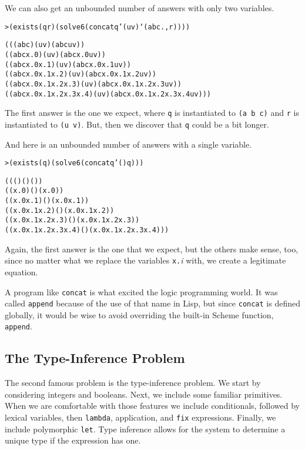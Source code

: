 We can also get an unbounded number of answers with only two variables.

\begin{alltt}
> (exists (q r) (solve 6 (concat q '(u v) `(a b c . ,r))))

(((a b c) (u v) (a b c u v))
((a b c x.0) (u v) (a b c x.0 u v))
((a b c x.0 x.1) (u v) (a b c x.0 x.1 u v))
((a b c x.0 x.1 x.2) (u v) (a b c x.0 x.1 x.2 u v))
((a b c x.0 x.1 x.2 x.3) (u v) (a b c x.0 x.1 x.2 x.3 u v))
((a b c x.0 x.1 x.2 x.3 x.4) (u v) (a b c x.0 x.1 x.2 x.3 x.4 u v)))
\end{alltt}

\noindent
The first answer is the one we expect, where \texttt{q} is
instantiated to \texttt{(a b c)} and \texttt{r} is instantiated to
\texttt{(u v)}.  But, then we discover that \texttt{q} could be a bit
longer.  

And here is an unbounded number of answers with a single variable.

\begin{alltt}
> (exists (q) (solve 6 (concat q '() q)))

((() () ())
((x.0) () (x.0))
((x.0 x.1) () (x.0 x.1))
((x.0 x.1 x.2) () (x.0 x.1 x.2))
((x.0 x.1 x.2 x.3) () (x.0 x.1 x.2 x.3))
((x.0 x.1 x.2 x.3 x.4) () (x.0 x.1 x.2 x.3 x.4)))
\end{alltt}

\noindent
Again, the first answer is the one that we expect, but
the others make sense, too, since no matter what we replace
the variables \texttt{x.}\emph{i} with, we create a
legitimate equation.

A program like \texttt{concat} is what excited the
logic programming world.  It was called \texttt{append}
because of the use of that name in Lisp, but since 
\texttt{concat} is defined globally, it would be wise to
avoid overriding the built-in Scheme function, \texttt{append}.

\subsection{The Type-Inference Problem}

The second famous problem is the type-inference problem.  We start by
considering integers and booleans.  Next, we include some familiar
primitives.  When we are comfortable with those features we include
conditionals, followed by lexical variables, then \texttt{lambda},
application, and \texttt{fix} expressions. Finally, we include
polymorphic \texttt{let}.  Type inference allows for the system to
determine a unique type if the expression has one. 

